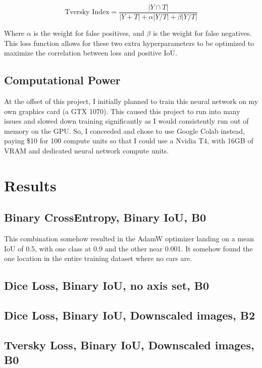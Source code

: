 \documentclass[12pt]{article}
\begin{document}
    \[
        \text{Tversky Index} = \frac{| Y \cap T | }{|Y + T| + \alpha|Y/T| + \beta|Y/T|}
    \]

    Where $\alpha$ is the weight for false positives, and $\beta$ is the weight for false negatives. This loss function allows for these two extra hyperparameters to be optimized to maximize the correlation between loss and positive IoU.

    \subsection*{Computational Power}

    At the offset of this project, I initially planned to train this neural network on my own graphics card (a GTX 1070). This caused this project to run into many issues and slowed down training significantly as I would consistently run out of memory on the GPU. So, I conceeded and chose to use Google Colab instead, paying \$10 for 100 compute units so that I could use a Nvidia T4, with 16GB of VRAM and dedicated neural network compute units.

    \section{Results}

    \subsection*{Binary CrossEntropy, Binary IoU, B0}

    This combination somehow resulted in the AdamW optimizer landing on a mean IoU of 0.5, with one class at 0.9 and the other near 0.001. It somehow found the one location in the entire training dataset where no cars are.

    \subsection*{Dice Loss, Binary IoU, no axis set, B0}

    \subsection*{Dice Loss, Binary IoU, Downscaled images, B2}

    \subsection*{Tversky Loss, Binary IoU, Downscaled images, B0}
\end{document}
